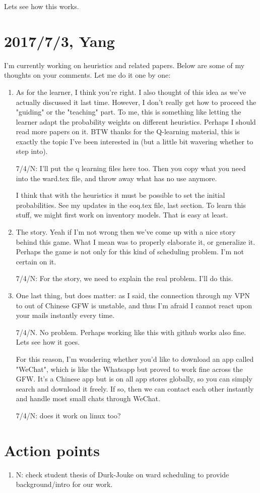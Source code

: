 \documentclass{article}
\begin{document}
Lets see how this works.



\section{2017/7/3, Yang}
\label{sec:201773-yang}

I'm currently working on heuristics and related papers. Below are some of my thoughts on your comments. Let me do it one by one:

\begin{enumerate}
\item As for the learner, I think you're right. I also thought of this idea as we've actually discussed it last time. However, I don't really get how to proceed the "guiding" or the "teaching" part. To me, this is something like letting the learner adapt the probability weights on different heuristics. Perhaps I should read more papers on it. BTW thanks for the Q-learning material, this is exactly the topic I've been interested in (but a little bit wavering whether to step into).

7/4/N: I'll put the q learning files here too. Then you copy what you need into the ward.tex file, and throw away what has no use anymore.

I think that with the heuristics it must be possible to set the initial probabilities. See my updates in the eoq.tex file, last section. To learn this stuff, we might first work on inventory models. That is easy at least.

\item The story. Yeah if I'm not wrong then we've come up with a nice story behind this game. What I mean was to properly elaborate it, or generalize it. Perhaps the game is not only for this kind of scheduling problem. I'm not certain on it.


7/4/N: For the story, we need to explain the real problem. I'll do this. 

\item One last thing, but does matter: as I said, the connection through my VPN to out of Chinese GFW is unstable, and thus I'm afraid I cannot react upon your mails instantly every time. 


7/4/N. No problem. Perhaps working like this with github works also fine. Lets see how it goes.

For this reason, I'm wondering whether you'd like to download an app called "WeChat", which is like the Whatsapp but proved to work fine across the GFW. It's a Chinese app but is on all app stores globally, so you can simply search and download it freely. If so, then we can contact each other instantly and handle most small chats through WeChat.

7/4/N: does it work on linux too? 

\end{enumerate}

\section{Action points}
\label{sec:action-points}

\begin{enumerate}
\item N: check student thesis of Durk-Jouke on ward scheduling to provide background/intro for our work.
\end{enumerate}
\end{document}
